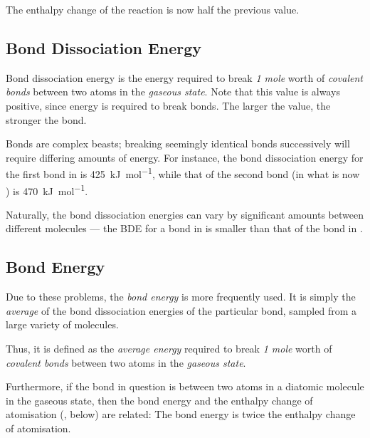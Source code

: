 
		The enthalpy change of the reaction is now half the previous value.


	\pagebreak
	\subsection{Bond Dissociation Energy}

		Bond dissociation energy is the energy required to break \textit{1 mole} worth of \textit{covalent bonds} between two atoms in the
		\textit{gaseous state}. Note that this value is always positive, since energy is required to break bonds. The larger the value,
		the stronger the bond.

		Bonds are complex beasts; breaking seemingly identical bonds successively will require differing amounts of energy. For instance, the
		bond dissociation energy for the first  bond in  is \SI{425}{\kilo\joule\per\mole}, while that of the second 
		bond (in what is now ) is \SI{470}{\kilo\joule\per\mole}.

		Naturally, the bond dissociation energies can vary by significant amounts between different molecules --- the BDE for a  bond
		in  is smaller than that of the  bond in .


	\subsection{Bond Energy}

		Due to these problems, the \textit{bond energy} is more frequently used. It is simply the \textit{average} of the bond dissociation
		energies of the particular bond, sampled from a large variety of molecules.

		Thus, it is defined as the \textit{average energy} required to break \textit{1 mole} worth of \textit{covalent bonds} between two
		atoms in the \textit{gaseous state}.

		Furthermore, if the bond in question is between two atoms in a diatomic molecule in the gaseous state, then the bond energy and
		the enthalpy change of atomisation (, below) are related: The bond energy is twice the enthalpy change of atomisation.

